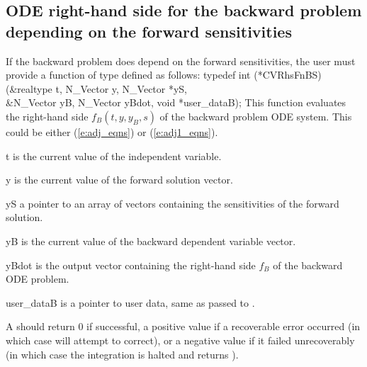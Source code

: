 \subsection{ODE right-hand side for the backward problem depending on the forward sensitivities}\label{ss:ODErhs_bs}

If the backward problem does depend on the forward sensitivities,
the user must provide a  function of type  defined as follows:
{
  typedef int (*CVRhsFnBS)(&realtype t, N\_Vector y, N\_Vector *yS, \\
                           &N\_Vector yB, N\_Vector yBdot, void *user\_dataB);
}
{
  This function evaluates the right-hand side $f_B(t, y, y_B, s)$ of the backward problem 
  ODE system.  This could be either (\ref{e:adj_eqns}) or (\ref{e:adj1_eqns}).
}
{
  \begin{args}
  \item[t]
    is the current value of the independent variable.
  \item[y]
    is the current value of the forward solution vector.
  \item[yS]
    a pointer to an array of  vectors containing the sensitivities of 
    the forward solution.
  \item[yB]
    is the current value of the backward dependent variable vector.
  \item[yBdot]
    is the output vector containing the right-hand side $f_B$ of the backward ODE problem.
  \item[user\_dataB]
    is a pointer to user data, same as passed to .
  \end{args}
}
{
  A  should return 0 if successful, a positive value if a recoverable
  error occurred (in which case {\cvodes} will attempt to correct), or a negative 
  value if it failed unrecoverably (in which case the integration is halted and
   returns ).
}
